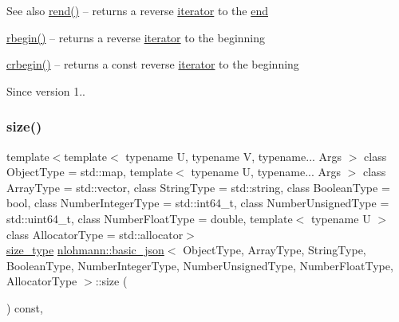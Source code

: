 \begin{DoxySeeAlso}{See also}
\hyperlink{classnlohmann_1_1basic__json_aaa160a960dd3dd90856a72b1d8dbe707}{rend()} -- returns a reverse \hyperlink{classnlohmann_1_1basic__json_1_1iterator}{iterator} to the \hyperlink{classnlohmann_1_1basic__json_a12ccf14d39ddae52f6c7e126105a230b}{end} 

\hyperlink{classnlohmann_1_1basic__json_a62ccf5b9b3674aec2403fbc02da03db8}{rbegin()} -- returns a reverse \hyperlink{classnlohmann_1_1basic__json_1_1iterator}{iterator} to the beginning 

\hyperlink{classnlohmann_1_1basic__json_a060b33f8f255986088652625f9d50681}{crbegin()} -- returns a const reverse \hyperlink{classnlohmann_1_1basic__json_1_1iterator}{iterator} to the beginning
\end{DoxySeeAlso}
\begin{DoxySince}{Since}
version 1.. 
\end{DoxySince}
\hypertarget{classnlohmann_1_1basic__json_a0ea8a1ecca4b3cb0ba09ad7552c364b6}{}\label{classnlohmann_1_1basic__json_a0ea8a1ecca4b3cb0ba09ad7552c364b6} 
\subsubsection{\texorpdfstring{size()}{size()}}
{\footnotesize\ttfamily template$<$template$<$ typename U, typename V, typename... Args $>$ class Object\+Type = std\+::map, template$<$ typename U, typename... Args $>$ class Array\+Type = std\+::vector, class String\+Type  = std\+::string, class Boolean\+Type  = bool, class Number\+Integer\+Type  = std\+::int64\+\_\+t, class Number\+Unsigned\+Type  = std\+::uint64\+\_\+t, class Number\+Float\+Type  = double, template$<$ typename U $>$ class Allocator\+Type = std\+::allocator$>$ \\
\hyperlink{classnlohmann_1_1basic__json_a1579a8f72a230358d6cd1a6e8a62859b}{size\+\_\+type} \hyperlink{classnlohmann_1_1basic__json}{nlohmann\+::basic\+\_\+json}$<$ Object\+Type, Array\+Type, String\+Type, Boolean\+Type, Number\+Integer\+Type, Number\+Unsigned\+Type, Number\+Float\+Type, Allocator\+Type $>$\+::size (\begin{DoxyParamCaption}{ }\end{DoxyParamCaption}) const\hspace{0.3cm}{\ttfamily [inline]}, {\ttfamily [noexcept]}}



